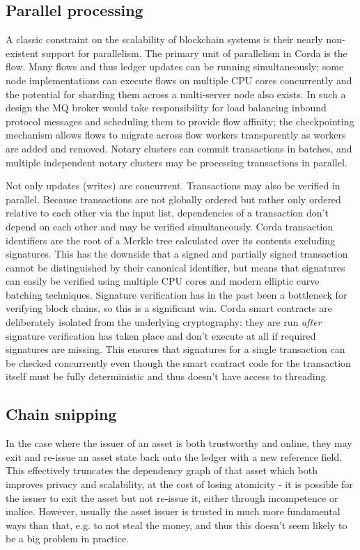 \documentclass{article}
\begin{document}
\subsection{Parallel processing}

A classic constraint on the scalability of blockchain systems is their nearly non-existent support for parallelism.
The primary unit of parallelism in Corda is the flow. Many flows and thus ledger updates can be running
simultaneously; some node implementations can execute flows on multiple CPU cores concurrently and the potential
for sharding them across a multi-server node also exists. In such a design the MQ broker would take responsibility
for load balancing inbound protocol messages and scheduling them to provide flow affinity; the checkpointing
mechanism allows flows to migrate across flow workers transparently as workers are added and removed. Notary
clusters can commit transactions in batches, and multiple independent notary clusters may be processing
transactions in parallel.

Not only updates (writes) are concurrent. Transactions may also be verified in parallel. Because transactions are
not globally ordered but rather only ordered relative to each other via the input list, dependencies of a
transaction don't depend on each other and may be verified simultaneously. Corda transaction identifiers are the
root of a Merkle tree calculated over its contents excluding signatures. This has the downside that a signed and
partially signed transaction cannot be distinguished by their canonical identifier, but means that signatures can
easily be verified using multiple CPU cores and modern elliptic curve batching techniques. Signature verification
has in the past been a bottleneck for verifying block chains, so this is a significant win. Corda smart contracts
are deliberately isolated from the underlying cryptography: they are run \emph{after} signature verification has
taken place and don't execute at all if required signatures are missing. This ensures that signatures for a single
transaction can be checked concurrently even though the smart contract code for the transaction itself must be
fully deterministic and thus doesn't have access to threading.

\subsection{Chain snipping}

In the case where the issuer of an asset is both trustworthy and online, they may exit and re-issue an asset state
back onto the ledger with a new reference field. This effectively truncates the dependency graph of that asset
which both improves privacy and scalability, at the cost of losing atomicity - it is possible for the issuer to
exit the asset but not re-issue it, either through incompetence or malice. However, usually the asset issuer is
trusted in much more fundamental ways than that, e.g. to not steal the money, and thus this doesn't seem likely to
be a big problem in practice.
\end{document}
